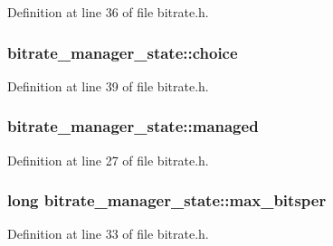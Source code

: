 Definition at line 36 of file bitrate.\+h.

\subsubsection[{\texorpdfstring{choice}{choice}}]{ bitrate\+\_\+manager\+\_\+state\+::choice}\hypertarget{structbitrate__manager__state_a705c9b3e162719911c04ab57e09d4149}{}\label{structbitrate__manager__state_a705c9b3e162719911c04ab57e09d4149}


Definition at line 39 of file bitrate.\+h.

\subsubsection[{\texorpdfstring{managed}{managed}}]{ bitrate\+\_\+manager\+\_\+state\+::managed}\hypertarget{structbitrate__manager__state_a874d426e03e2fe791ffaa18772ec73ca}{}\label{structbitrate__manager__state_a874d426e03e2fe791ffaa18772ec73ca}


Definition at line 27 of file bitrate.\+h.

\subsubsection[{\texorpdfstring{max\+\_\+bitsper}{max_bitsper}}]{\setlength{\rightskip}{0pt plus 5cm}long bitrate\+\_\+manager\+\_\+state\+::max\+\_\+bitsper}\hypertarget{structbitrate__manager__state_a48f87c07fd01af4160d38c39d17aa1f2}{}\label{structbitrate__manager__state_a48f87c07fd01af4160d38c39d17aa1f2}


Definition at line 33 of file bitrate.\+h.

